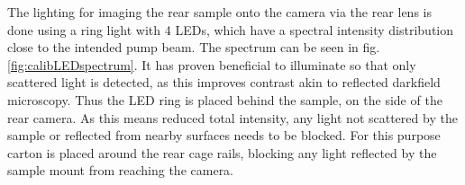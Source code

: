 \documentclass[twoside,openright,listof=numbered]{scrreprt}
\begin{document}
The lighting for imaging the rear sample onto the camera via the rear lens is done using a ring light with 4 LEDs, which have a spectral intensity distribution close to the intended pump beam. The spectrum can be seen in fig. \ref{fig:calibLEDspectrum}.
It has proven beneficial to illuminate so that only scattered light is detected, as this improves contrast akin to reflected darkfield microscopy.\cite{Zeiss} Thus the LED ring is placed behind the sample, on the side of the rear camera. As this means reduced total intensity, any light not scattered by the sample or reflected from nearby surfaces needs to be blocked. For this purpose carton is placed around the rear cage rails, blocking any light reflected by the sample mount from reaching the camera.
\end{document}
